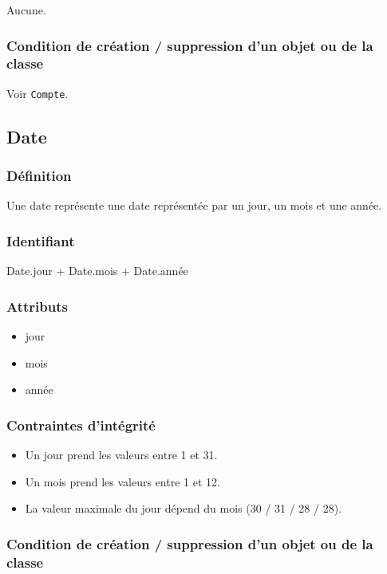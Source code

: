 Aucune.

\subsubsection{Condition de création / suppression d'un objet ou de la classe}

Voir \texttt{Compte}.

\subsection{Date}

\subsubsection{Définition}

Une date représente une date représentée par un jour, un mois et une année.

\subsubsection{Identifiant}

Date.jour + Date.mois + Date.année

\subsubsection{Attributs}

\begin{itemize}

    \item{jour}
    \item{mois}
    \item{année}

\end{itemize}

\subsubsection{Contraintes d'intégrité}

\begin{itemize}
    \item Un jour prend les valeurs entre 1 et 31.
    \item Un mois prend les valeurs entre 1 et 12.
    \item La valeur maximale du jour dépend du mois (30 / 31 / 28 / 28).
\end{itemize}

\subsubsection{Condition de création / suppression d'un objet ou de la classe}

